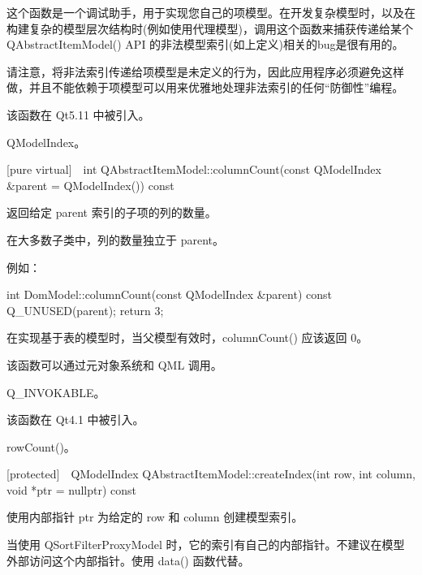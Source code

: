 \begin{notice}
这个函数是一个调试助手，用于实现您自己的项模型。在开发复杂模型时，以及在构建复杂的模型层次结构时(例如使用代理模型)，调用这个函数来捕获传递给某个 QAbstractItemModel() API 的非法模型索引(如上定义)相关的bug是很有用的。
\end{notice}

\begin{warning}
请注意，将非法索引传递给项模型是未定义的行为，因此应用程序必须避免这样做，并且不能依赖于项模型可以用来优雅地处理非法索引的任何“防御性”编程。
\end{warning}


该函数在 Qt5.11 中被引入。

\begin{seeAlso}
QModelIndex。
\end{seeAlso}

[pure virtual] int QAbstractItemModel::columnCount(const QModelIndex \&parent = QModelIndex()) const

返回给定 parent 索引的子项的列的数量。

在大多数子类中，列的数量独立于 parent。

例如：

\begin{cppcode}
int DomModel::columnCount(const QModelIndex &parent) const
{
     Q_UNUSED(parent);
     return 3;
}
\end{cppcode}

\begin{notice}
在实现基于表的模型时，当父模型有效时，columnCount() 应该返回 0。
\end{notice}

\begin{notice}
该函数可以通过元对象系统和 QML 调用。
\end{notice}

\begin{seeAlso}
Q\_INVOKABLE。
\end{seeAlso}

该函数在 Qt4.1 中被引入。

\begin{seeAlso}
rowCount()。
\end{seeAlso}

[protected] QModelIndex QAbstractItemModel::createIndex(int row, int column, void *ptr = nullptr) const

使用内部指针 ptr 为给定的 row 和 column 创建模型索引。

当使用 QSortFilterProxyModel 时，它的索引有自己的内部指针。不建议在模型外部访问这个内部指针。使用 data() 函数代替。

